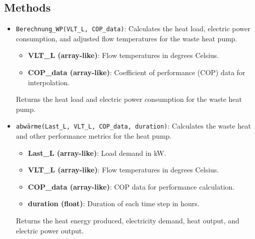 \subsection{Methods}
\begin{itemize}
    \item \texttt{Berechnung\_WP(VLT\_L, COP\_data)}: Calculates the heat load, electric power consumption, and adjusted flow temperatures for the waste heat pump.
    \begin{itemize}
        \item \textbf{VLT\_L (array-like)}: Flow temperatures in degrees Celsius.
        \item \textbf{COP\_data (array-like)}: Coefficient of performance (COP) data for interpolation.
    \end{itemize}
    Returns the heat load and electric power consumption for the waste heat pump.

    \item \texttt{abwärme(Last\_L, VLT\_L, COP\_data, duration)}: Calculates the waste heat and other performance metrics for the heat pump.
    \begin{itemize}
        \item \textbf{Last\_L (array-like)}: Load demand in kW.
        \item \textbf{VLT\_L (array-like)}: Flow temperatures in degrees Celsius.
        \item \textbf{COP\_data (array-like)}: COP data for performance calculation.
        \item \textbf{duration (float)}: Duration of each time step in hours.
    \end{itemize}
    Returns the heat energy produced, electricity demand, heat output, and electric power output.


\end{itemize}
